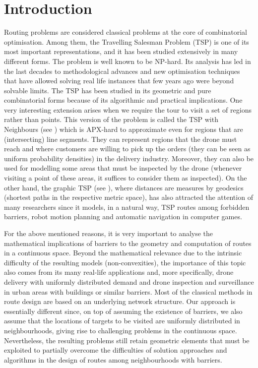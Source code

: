 \documentclass[a4paper,  review, authoryear, 1p.]{elsarticle}
\begin{document}
	\section{Introduction}
	Routing problems are considered classical problems at the core of combinatorial optimisation. Among them, the Travelling Salesman Problem (TSP) is one of its most important representations, and it has been studied extensively in many different forms. The problem is well known to be NP-hard. Its analysis has led in the last decades to methodological advances and new optimisation techniques that have allowed solving real life instances that few years ago were beyond solvable limits. The TSP has been studied in its geometric and pure combinatorial forms because of its algorithmic and practical implications. One very interesting extension arises when we require the tour to visit a set of regions rather than points. This version of the problem is called the TSP with Neighbours (see  \citet{arkin1994a}) which is APX-hard to approximate even for regions that are (intersecting) line segments.  They can represent regions that the drone must reach and where customers are willing to pick up the orders (they can be seen as uniform probability densities) in the delivery industry. Moreover, they can also be used for modelling some areas that must be inspected by the drone (whenever visiting a point of these areas, it suffices to consider them as inspected).  On the other hand, the graphic TSP (see \citet{t.moemke22}), where distances are measures by geodesics (shortest paths in the respective metric space), has also attracted the attention of many researchers since it models, in a natural way, TSP routes among forbidden barriers, robot motion planning and automatic navigation in computer games. 
	
	For the above mentioned reasons, it is very important to analyse the mathematical implications of barriers to the geometry and computation of routes in a continuous space. Beyond the mathematical relevance due to the intrinsic difficulty of the resulting models (non-convexities), the importance of this topic also comes from its many real-life applications and, more specifically, drone delivery with uniformly distributed demand and drone inspection and surveillance in urban areas with buildings or similar barriers.  Most of the classical methods in route design are based on an underlying network structure. Our approach is essentially different since, on top of assuming the existence of barriers, we also assume that the locations of targets to be visited are uniformly distributed in neighbourhoods, giving rise to challenging problems in the continuous space. Nevertheless, the resulting problems still retain geometric elements that must be exploited to partially overcome the difficulties of solution approaches and algorithms in the design of routes among neighbourhoods with barriers.
	
\end{document}
